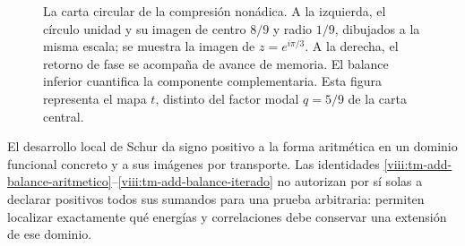 \begin{figure}[htbp]
\centering
{}
\caption{La carta circular de la compresión nonádica. A la izquierda,
el círculo unidad y su imagen de centro \(8/9\) y radio \(1/9\),
dibujados a la misma escala; se muestra la imagen de \(z=e^{i\pi/3}\).
A la derecha, el retorno de fase se acompaña de avance de memoria.
El balance inferior cuantifica la componente complementaria. Esta figura
representa el mapa \(t\), distinto del factor modal \(q=5/9\) de la
carta central.}
\label{viii:fig:compresion-circular}
\end{figure}



El desarrollo local de Schur da signo positivo a la forma aritmética en un dominio funcional concreto y a sus imágenes por transporte. Las identidades \eqref{viii:tm-add-balance-aritmetico}–\eqref{viii:tm-add-balance-iterado} no autorizan por sí solas a declarar positivos todos sus sumandos para una prueba arbitraria: permiten localizar exactamente qué energías y correlaciones debe conservar una extensión de ese dominio.


